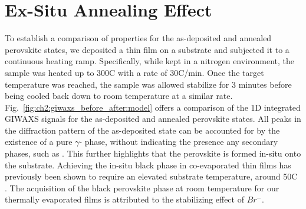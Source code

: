 \section{Ex-Situ Annealing Effect}\label{sec:ex_situ}


To establish a comparison of properties for the as-deposited and annealed perovskite states, we deposited a  thin film on a  substrate and subjected it to a continuous heating ramp. Specifically, while kept in a nitrogen environment, the sample was heated up to 300\degree C with a rate of 30\degree C/min. Once the target temperature was reached, the sample was allowed stabilize for 3 minutes before being cooled back down to room temperature at a similar rate. Fig.~\ref{fig:ch2:giwaxs_before_after:model} offers a comparison of the 1D integrated GIWAXS signals for the as-deposited and annealed perovskite states. All peaks in the diffraction pattern of the as-deposited state can be accounted for by the existence of a pure $\gamma$- phase, without indicating the presence any secondary phases, such as . This further highlights that the perovskite is formed in-situ onto the substrate. Achieving the in-situ black phase in co-evaporated  thin films has previously been shown to require an elevated substrate temperature, around 50\degree C \cite{Dong2023GrowthFilm, Becker2019LowExperimentation}. The acquisition of the black perovskite phase at room temperature for our thermally evaporated films is attributed to the stabilizing effect of $Br^-$. 

